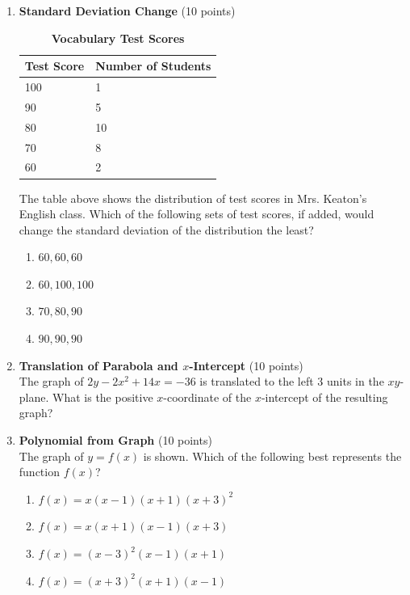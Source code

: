 \begin{enumerate}
  \item \textbf{Standard Deviation Change} (10 points)\\
  \begin{table}[h!]
  \centering
  \renewcommand{\arraystretch}{1.3}
  \setlength{\tabcolsep}{12pt}
  \caption*{\textbf{Vocabulary Test Scores}}
  \begin{tabular}{|l|l|}
    \hline
    Test Score & Number of Students \\
    \hline
    100 & 1 \\
    90 & 5 \\
    80 & 10 \\
    70 & 8 \\
    60 & 2 \\
    \hline
  \end{tabular}
  \end{table}
  The table above shows the distribution of test scores in Mrs. Keaton's English class. Which of the following sets of test scores, if added, would change the standard deviation of the distribution the least?
  \begin{enumerate}[label=(\Alph*)]
    \item $60,60,60$
    \item $60,100,100$
    \item $70,80,90$
    \item $90,90,90$
  \end{enumerate}
  \begin{subanswer}
  \end{subanswer}

  \item \textbf{Translation of Parabola and $x$-Intercept} (10 points)\\
  The graph of $2y-2x^2+14x=-36$ is translated to the left 3 units in the $xy$-plane. What is the positive $x$-coordinate of the $x$-intercept of the resulting graph?
  \begin{subanswer}
  \end{subanswer}


  \newpage

  \item \textbf{Polynomial from Graph} (10 points)\\
  The graph of $y=f(x)$ is shown. Which of the following best represents the function $f(x)$?
  \begin{enumerate}[label=(\Alph*)]
    \item $f(x)=x(x-1)(x+1)(x+3)^2$
    \item $f(x)=x(x+1)(x-1)(x+3)$
    \item $f(x)=(x-3)^2(x-1)(x+1)$
    \item $f(x)=(x+3)^2(x+1)(x-1)$
  \end{enumerate}
  \begin{subanswer}
  \end{subanswer}


\end{enumerate}
